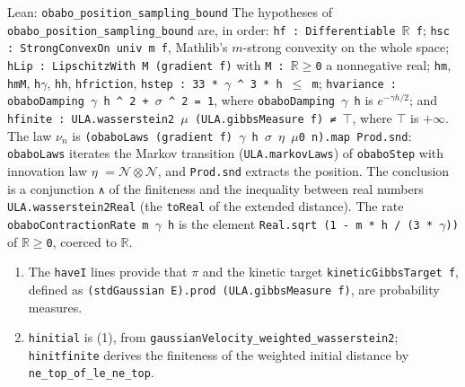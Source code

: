 \documentclass[11pt,a4paper]{article}
\begin{document}
\begin{leanbox}{Lean: \texttt{obabo\_\allowbreak{}position\_\allowbreak{}sampling\_\allowbreak{}bound}}
The hypotheses of \texttt{obabo\_\allowbreak{}position\_\allowbreak{}sampling\_\allowbreak{}bound} are, in order: \texttt{hf : Differentiable \ensuremath{\mathbb R} f}; \texttt{hsc : Strong\allowbreak{}Convex\allowbreak{}On univ m f}, Mathlib's \(m\)-strong convexity on the whole space; \texttt{h\allowbreak{}Lip : Lipschitz\allowbreak{}With M (gradient f)} with \texttt{M : \ensuremath{\mathbb R}\ensuremath{\ge}0} a nonnegative real; \texttt{hm}, \texttt{hm\allowbreak{}M}, \texttt{h\ensuremath{\gamma}}, \texttt{hh}, \texttt{hfriction}, \texttt{hstep : 33 * \ensuremath{\gamma} \textasciicircum{} 3 * h \ensuremath{\le} m}; \texttt{hvariance : obabo\allowbreak{}Damping \ensuremath{\gamma} h \textasciicircum{} 2 + \ensuremath{\sigma} \textasciicircum{} 2 = 1}, where \texttt{obabo\allowbreak{}Damping \ensuremath{\gamma} h} is \(e^{-\gamma h/2}\); and \texttt{hfinite : ULA.\allowbreak{}wasserstein2 \ensuremath{\mu} (ULA.\allowbreak{}gibbs\allowbreak{}Measure f) ≠ \ensuremath{\top}}, where \texttt{\ensuremath{\top}} is \(+\infty\). The law \(\nu_n\) is \texttt{(obabo\allowbreak{}Laws (gradient f) \ensuremath{\gamma} h \ensuremath{\sigma} \ensuremath{\eta} \ensuremath{\mu}0 n).\allowbreak{}map Prod.\allowbreak{}snd}: \texttt{obabo\allowbreak{}Laws} iterates the Markov transition (\texttt{ULA.\allowbreak{}markov\allowbreak{}Laws}) of \texttt{obabo\allowbreak{}Step} with innovation law \texttt{\ensuremath{\eta}} \(=\mathcal N\otimes\mathcal N\), and \texttt{Prod.\allowbreak{}snd} extracts the position. The conclusion is a conjunction \texttt{∧} of the finiteness and the inequality between real numbers \texttt{ULA.\allowbreak{}wasserstein2\allowbreak{}Real} (the \texttt{to\allowbreak{}Real} of the extended distance). The rate \texttt{obabo\allowbreak{}Contraction\allowbreak{}Rate m \ensuremath{\gamma} h} is the element \texttt{Real.\allowbreak{}sqrt (1 -\allowbreak{} m * h /\allowbreak{} (3 * \ensuremath{\gamma}))} of \texttt{\ensuremath{\mathbb R}\ensuremath{\ge}0}, coerced to \texttt{\ensuremath{\mathbb R}}.



\begin{enumerate}


\item The \texttt{have\allowbreak{}I} lines provide that \(\pi\) and the kinetic target \texttt{kinetic\allowbreak{}Gibbs\allowbreak{}Target f}, defined as \texttt{(std\allowbreak{}Gaussian E).\allowbreak{}prod (ULA.\allowbreak{}gibbs\allowbreak{}Measure f)}, are probability measures.

\item \texttt{hinitial} is (1), from \texttt{gaussian\allowbreak{}Velocity\_\allowbreak{}weighted\_\allowbreak{}wasserstein2}; \texttt{hinitfinite} derives the finiteness of the weighted initial distance by \texttt{ne\_\allowbreak{}top\_\allowbreak{}of\_\allowbreak{}le\_\allowbreak{}ne\_\allowbreak{}top}.


\end{enumerate}
\end{leanbox}
\end{document}

